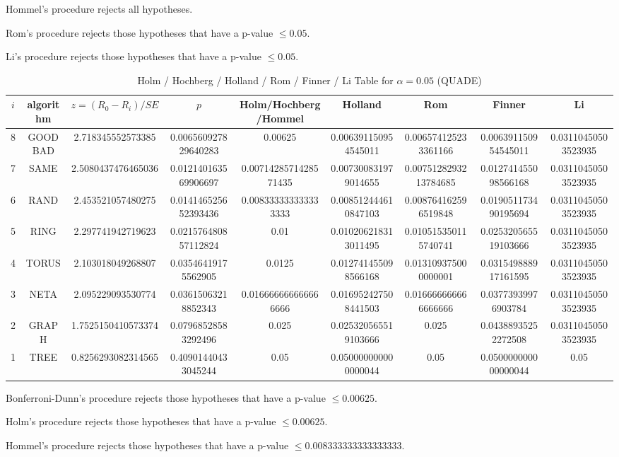 \documentclass[a4paper,10pt]{article}
\begin{document}
\begin{landscape}
Hommel's procedure rejects all hypotheses.


Rom's procedure rejects those hypotheses that have a p-value $\le0.05$.


Li's procedure rejects those hypotheses that have a p-value $\le0.05$.



\newpage

\begin{table}[!htp]
\centering\scriptsize
\caption{Holm / Hochberg / Holland / Rom / Finner / Li Table for $\alpha=0.05$ (QUADE)}
\begin{tabular}{ccccccccc}
$i$&algorithm&$z=(R_0 - R_i)/SE$&$p$&Holm/Hochberg/Hommel&Holland&Rom&Finner&Li\\
\hline
8& GOODBAD&2.718345552573385&0.006560927829640283&0.00625&0.006391150954545011&0.006574125233361166&0.006391150954545011&0.03110450503523935\\
7& SAME&2.5080437476465036&0.012140163569906697&0.0071428571428571435&0.007300831979014655&0.0075128293213784685&0.012741455098566168&0.03110450503523935\\
6& RAND&2.453521057480275&0.014146525652393436&0.008333333333333333&0.008512444610847103&0.008764162596519848&0.019051173490195694&0.03110450503523935\\
5& RING&2.297741942719623&0.021576480857112824&0.01&0.010206218313011495&0.010515350115740741&0.025320565519103666&0.03110450503523935\\
4& TORUS&2.103018049268807&0.03546419175562905&0.0125&0.012741455098566168&0.013109375000000001&0.031549888917161595&0.03110450503523935\\
3& NETA&2.095229093530774&0.03615063218852343&0.016666666666666666&0.016952427508441503&0.016666666666666666&0.03773939976903784&0.03110450503523935\\
2& GRAPH&1.7525150410573374&0.07968528583292496&0.025&0.025320565519103666&0.025&0.04388935252272508&0.03110450503523935\\
1& TREE&0.8256293082314565&0.40901440433045244&0.05&0.050000000000000044&0.05&0.050000000000000044&0.05\\
\hline
\end{tabular}
\end{table}
Bonferroni-Dunn's procedure rejects those hypotheses that have a p-value $\le0.00625$.


Holm's procedure rejects those hypotheses that have a p-value $\le0.00625$.


Hommel's procedure rejects those hypotheses that have a p-value $\le0.008333333333333333$.



\end{landscape}
\end{document}
